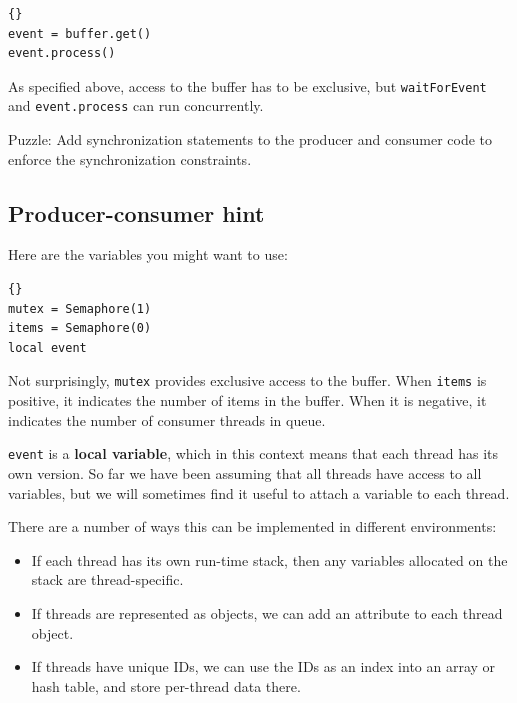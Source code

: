\documentclass{book}
\newcommand{\clearemptydoublepage}{\newpage\cleardoublepage}
\begin{document}
\begin{lstlisting}[caption={Basic consumer code}]{}
event = buffer.get()
event.process()
\end{lstlisting}

As specified above, access to the buffer has to be exclusive,
but {\tt waitForEvent} and {\tt event.process}
can run concurrently.

Puzzle: Add synchronization statements to the producer and
consumer code to enforce the synchronization constraints.

\clearemptydoublepage
\subsection{Producer-consumer hint}

Here are the variables you might want to use:

\begin{lstlisting}[caption={Producer-consumer initialization}]{}
mutex = Semaphore(1)
items = Semaphore(0)
local event
\end{lstlisting}

Not surprisingly, {\tt mutex} provides exclusive access to
the buffer.  When {\tt items} is positive, it indicates the
number of items in the buffer.  When it is negative, it
indicates the number of consumer threads in queue.

{\tt event} is a {\bf local variable}, which in this context means
that each thread has its own version.
So far we have been assuming that all threads have access
to all variables, but we will sometimes find it useful to
attach a variable to each thread.

There are a number of ways this can be implemented in different
environments:

\begin{itemize}

\item If each thread has its own run-time stack, then any variables
allocated on the stack are thread-specific.

\item If threads are represented as objects, we can add an attribute
to each thread object.

\item If threads have unique IDs, we can use the IDs as an index
into an array or hash table, and store per-thread data there.

\end{itemize}
\end{document}

